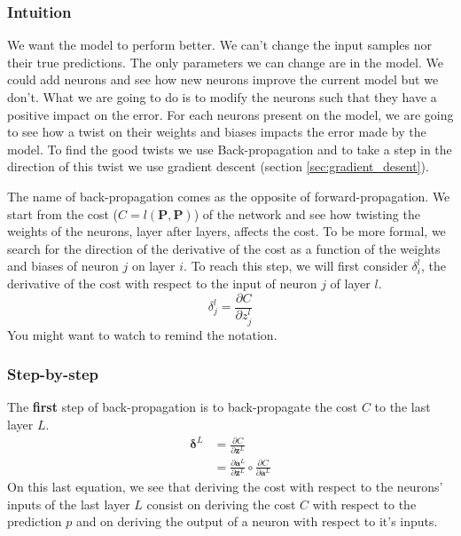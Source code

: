 		\subsubsection{Intuition}
			We want the model to perform better. We can't change the input samples nor their true predictions. The only parameters we can change are in the model. We could add neurons and see how new neurons improve the current model but we don't. What we are going to do is to modify the neurons such that they have a positive impact on the error. For each neurons present on the model, we are going to see how a twist on their weights and biases impacts the error made by the model. To find the good twists we use Back-propagation and to take a step in the direction of this twist we use gradient descent (section \ref{sec:gradient_desent}).

			The name of back-propagation comes as the opposite of forward-propagation. We start from the cost ($C=l(\boldsymbol{P},\boldsymbol{P})$) of the network and see how twisting the weights of the neurons, layer after layers, affects the cost. To be more formal, we search for the direction of the derivative of the cost as a function of the weights and biases of neuron $j$ on layer $i$. To reach this step, we will first consider $\delta^l_i$, the derivative of the cost with respect to the input of neuron $j$ of layer $l$.
			$$ \delta^l_j = \frac{\partial C}{\partial z^l_j } $$
			You might want to watch  to remind the notation.

		\subsubsection{Step-by-step}
			The \textbf{first} step of back-propagation is to back-propagate the cost $C$ to the last layer $L$.
			\begin{equation}
				\begin{split}
					\boldsymbol{\delta}^L
					&= \frac{\partial C}{\partial \boldsymbol{z}^L } \\
					&= \frac{\partial \boldsymbol{a}^L }{\partial \boldsymbol{z}^L } \circ \frac{\partial C}{\partial \boldsymbol{a}^L }
				\end{split}
			\end{equation}
			On this last equation, we see that deriving the cost with respect to the neurons' inputs of the last layer $L$ consist on deriving the cost $C$ with respect to the prediction $p$ and on deriving the output of a neuron with respect to it's inputs. 

